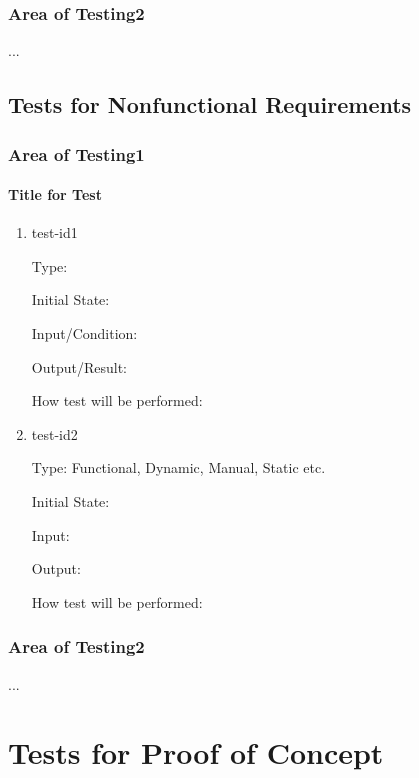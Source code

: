 \documentclass[12pt, titlepage]{article}
\begin{document}
\subsubsection{Area of Testing2}

...

\subsection{Tests for Nonfunctional Requirements}

\subsubsection{Area of Testing1}
		
\paragraph{Title for Test}

\begin{enumerate}

\item{test-id1\\}

Type: 
					
Initial State: 
					
Input/Condition: 
					
Output/Result: 
					
How test will be performed: 
					
\item{test-id2\\}

Type: Functional, Dynamic, Manual, Static etc.
					
Initial State: 
					
Input: 
					
Output: 
					
How test will be performed: 

\end{enumerate}

\subsubsection{Area of Testing2}

...

\section{Tests for Proof of Concept}
\end{document}

